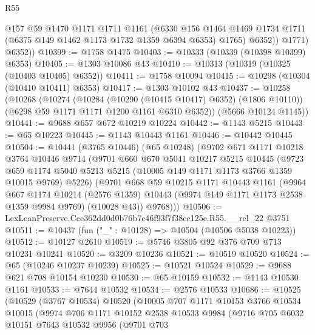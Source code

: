 \begin{lexlean}{R55}
\begin{coremodule}
              @157
              @59
              @1470
              @1171
              @1711
              @1161
              (@6330
                @156
                @1464
                @1469
                @1734
                @1711
                (@6375 @149 @1462 @1173 @1732 @1359 @6394 @6353)
                @1765)
              @6352))
          @1771)
        @6352))
@10399 := @1758 @1475
@10403 := @10333 (@10339 (@10398 @10399) @6353)
@10405 := @1303 @10086 @43
@10410 := @10313 (@10319 (@10325 (@10403 @10405) @6352))
@10411 := @1758 @10094
@10415 := @10298 (@10304 (@10410 @10411) @6353)
@10417 := @1303 @10102 @43
@10437 := @10258
    (@10268
      (@10274
        (@10284 (@10290 (@10415 @10417) @6352) (@1806 @10110))
        (@6298 @59 @1171 @1171 @1200 @1161 @6310 @6352))
      (@5666 @10124 @1145))
@10441 := @9688 @657 @672 @10219 @10224
@10442 := @1143 @5215
@10443 := @65 @10223
@10445 := @1143 @10443 @1161
@10446 := @10442 @10445
@10504 := @10441
    (@3765 @10446)
    (@65 @10248)
    (@9702
      @671
      @1171
      @10218
      @3764
      @10446
      @9714
      (@9701
        @660
        @670
        @5041
        @10217
        @5215
        @10445
        (@9723
          @659
          @1174
          @5040
          @5213
          @5215
          (@10005 @149 @1171 @1173 @3766 @1359 @10015 @9769)
          @5226)
        (@9701
          @668
          @59
          @10215
          @1171
          @10443
          @1161
          (@9964
            @667
            @1174
            @10214
            (@2576 @1359)
            @10443
            (@9974 @149 @1171 @1173 @2538 @1359 @9984 @9769)
            (@10028 @43))
          @9768)))
@10506 := LexLeanPreserve.Ccc362dd0d0b76b7c46f93f7f38ec125e.R55.__rel_22 @3751
@10511 := @10437 (fun ("_" : @10128) => @10504 (@10506 @5038 @10223))
@10512 := @10127 @2610
@10519 := @5746 @3805 @92 @376 @709 @713 @10231 @10241
@10520 := @3209 @10236
@10521 := @10519 @10520
@10524 := @65 (@10246 @10237 @10239)
@10525 := @10521 @10524
@10529 := @9688 @621 @708 @10154 @10230
@10530 := @65 @10159
@10532 := @1143 @10530 @1161
@10533 := @7644 @10532
@10534 := @2576 @10533
@10686 := @10525
    (@10529
      (@3767 @10534)
      @10520
      (@10005
        @707
        @1171
        @10153
        @3766
        @10534
        @10015
        (@9974
          @706
          @1171
          @10152
          @2538
          @10533
          @9984
          (@9716
            @705
            @6032
            @10151
            @7643
            @10532
            @9956
            (@9701
              @703

\end{coremodule}
\end{lexlean}
